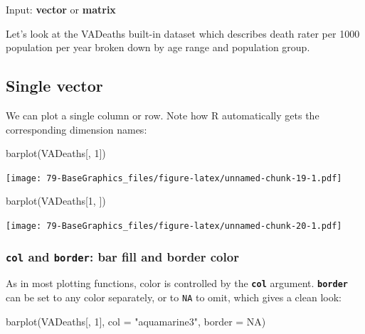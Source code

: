 \documentclass[
]{book}
\newenvironment{Shaded}{\begin{snugshade}}{\end{snugshade}}
\newcommand{\AttributeTok}[1]{\textcolor[rgb]{0.77,0.63,0.00}{#1}}
\newcommand{\ConstantTok}[1]{\textcolor[rgb]{0.00,0.00,0.00}{#1}}
\newcommand{\DecValTok}[1]{\textcolor[rgb]{0.00,0.00,0.81}{#1}}
\newcommand{\FunctionTok}[1]{\textcolor[rgb]{0.00,0.00,0.00}{#1}}
\newcommand{\NormalTok}[1]{#1}
\newcommand{\StringTok}[1]{\textcolor[rgb]{0.31,0.60,0.02}{#1}}
\begin{document}
Input: \textbf{vector} or \textbf{matrix}

Let's look at the VADeaths built-in dataset which describes death rater per 1000 population per year broken down by age range and population group.

\hypertarget{single-vector}{%
\subsection{Single vector}\label{single-vector}}

We can plot a single column or row. Note how R automatically gets the corresponding dimension names:

\begin{Shaded}
\begin{Highlighting}[]
\FunctionTok{barplot}\NormalTok{(VADeaths[, }\DecValTok{1}\NormalTok{])}
\end{Highlighting}
\end{Shaded}

\texttt{[image: 79-BaseGraphics\_files/figure-latex/unnamed-chunk-19-1.pdf]}

\begin{Shaded}
\begin{Highlighting}[]
\FunctionTok{barplot}\NormalTok{(VADeaths[}\DecValTok{1}\NormalTok{, ])}
\end{Highlighting}
\end{Shaded}

\texttt{[image: 79-BaseGraphics\_files/figure-latex/unnamed-chunk-20-1.pdf]}

\hypertarget{col-and-border-bar-fill-and-border-color}{%
\subsubsection{\texorpdfstring{\textbf{\texttt{col}} and \textbf{\texttt{border}}: bar fill and border color}{col and border: bar fill and border color}}\label{col-and-border-bar-fill-and-border-color}}

As in most plotting functions, color is controlled by the \textbf{\texttt{col}} argument. \textbf{\texttt{border}} can be set to any color separately, or to \texttt{NA} to omit, which gives a clean look:

\begin{Shaded}
\begin{Highlighting}[]
\FunctionTok{barplot}\NormalTok{(VADeaths[, }\DecValTok{1}\NormalTok{],}
        \AttributeTok{col =} \StringTok{"aquamarine3"}\NormalTok{, }\AttributeTok{border =} \ConstantTok{NA}\NormalTok{)}
\end{Highlighting}
\end{Shaded}
\end{document}

